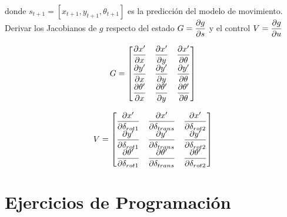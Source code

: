 \documentclass[tp]{lcc}
\begin{document}
    donde $s_{t+1} = [x_{t+1}, y_{t+1}, \theta_{t+1}]$ es la predicción del modelo de movimiento. Derivar los Jacobianos de $g$ respecto del estado $G = \dfrac{\partial g}{\partial s}$ y el control $V = \dfrac{\partial g}{\partial u}$
    
    \noindent
    \begin{minipage}[t]{.5\textwidth}
    \begin{equation*}
        G =
        \begin{bmatrix}
            \dfrac{\partial x^{\prime}}{\partial x} & \dfrac{\partial x^{\prime}}{\partial y} & \dfrac{\partial x^{\prime}}{\partial \theta}\\
            \dfrac{\partial y^{\prime}}{\partial x} & \dfrac{\partial y^{\prime}}{\partial y} & \dfrac{\partial y^{\prime}}{\partial \theta}\\
            \dfrac{\partial \theta^{\prime}}{\partial x} & \dfrac{\partial \theta^{\prime}}{\partial y} & \dfrac{\partial \theta^{\prime}}{\partial \theta}
        \end{bmatrix}
\end{equation*}
    \end{minipage}%
    \begin{minipage}[t]{.5\textwidth}
        \begin{equation*}
            V =
            \begin{bmatrix}
                \dfrac{\partial x^{\prime}}{\partial \delta_{rot1}} & \dfrac{\partial x^{\prime}}{\partial \delta_{trans}} & \dfrac{\partial x^{\prime}}{\partial \delta_{rot2}}\\
                \dfrac{\partial y^{\prime}}{\partial \delta_{rot1}} & \dfrac{\partial y^{\prime}}{\partial \delta_{trans}} & \dfrac{\partial y^{\prime}}{\partial \delta_{rot2}}\\
                \dfrac{\partial \theta^{\prime}}{\partial \delta_{rot1}} & \dfrac{\partial \theta^{\prime}}{\partial \delta_{trans}} & \dfrac{\partial \theta^{\prime}}{\partial \delta_{rot2}}
            \end{bmatrix}
        \end{equation*}
    \end{minipage}
    
	
	\section{Ejercicios de Programación}
		
\end{document}
